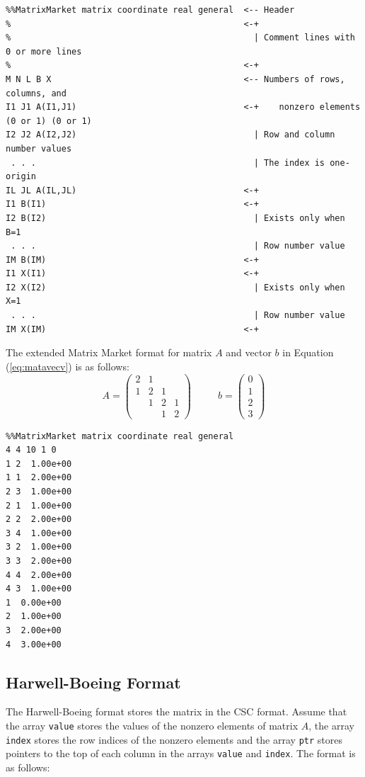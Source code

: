 \documentclass[a4paper]{article}
\begin{document}
{\small
\begin{verbatim}
%%MatrixMarket matrix coordinate real general  <-- Header
%                                              <-+ 
%                                                | Comment lines with 0 or more lines
%                                              <-+
M N L B X                                      <-- Numbers of rows, columns, and 
I1 J1 A(I1,J1)                                 <-+    nonzero elements (0 or 1) (0 or 1)
I2 J2 A(I2,J2)                                   | Row and column number values
 . . .                                           | The index is one-origin
IL JL A(IL,JL)                                 <-+
I1 B(I1)                                       <-+
I2 B(I2)                                         | Exists only when B=1
 . . .                                           | Row number value
IM B(IM)                                       <-+
I1 X(I1)                                       <-+
I2 X(I2)                                         | Exists only when X=1
 . . .                                           | Row number value
IM X(IM)                                       <-+
\end{verbatim}
}

The extended Matrix Market format for matrix $A$ and vector $b$ in Equation (\ref{eq:matavecv}) is as follows: 
\begin{equation}
A = 
\left(
\begin{array}{cccc}
2 & 1 &   &    \\
1 & 2 & 1 &    \\ 
  & 1 & 2 & 1 \\
  &   & 1 & 2 
\end{array}
\right)
~~~~~~~~~~~~
b = 
\left(
\begin{array}{c}
0 \\
1 \\ 
2 \\
3  
\end{array}
\right)
\label{eq:matavecv}
\end{equation}

{\small
\begin{verbatim}
%%MatrixMarket matrix coordinate real general
4 4 10 1 0
1 2  1.00e+00
1 1  2.00e+00
2 3  1.00e+00
2 1  1.00e+00
2 2  2.00e+00
3 4  1.00e+00
3 2  1.00e+00
3 3  2.00e+00
4 4  2.00e+00
4 3  1.00e+00
1  0.00e+00
2  1.00e+00
3  2.00e+00
4  3.00e+00
\end{verbatim}
}

\subsection{Harwell-Boeing Format}
The Harwell-Boeing format stores the matrix in the CSC format.
Assume that the array {\tt value} stores the values of the nonzero elements of matrix $A$, 
the array {\tt index} stores the row indices of the nonzero elements and 
the array {\tt ptr} stores pointers to the top of each column in the
arrays {\tt value} and {\tt index}. The format is as follows: 
\end{document}
